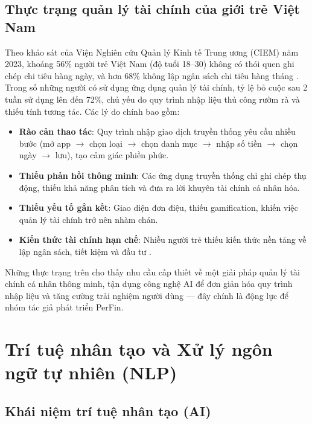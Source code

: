 \subsection{Thực trạng quản lý tài chính của giới trẻ Việt Nam}
\label{subsec:vietnam_youth_finance}

Theo khảo sát của Viện Nghiên cứu Quản lý Kinh tế Trung ương (CIEM) năm 2023, khoảng 56\% người trẻ Việt Nam (độ tuổi 18--30) không có thói quen ghi chép chi tiêu hàng ngày, và hơn 68\% không lập ngân sách chi tiêu hàng tháng \cite{ref5}. Trong số những người có sử dụng ứng dụng quản lý tài chính, tỷ lệ bỏ cuộc sau 2 tuần sử dụng lên đến 72\%, chủ yếu do quy trình nhập liệu thủ công rườm rà và thiếu tính tương tác. Các lý do chính bao gồm:

\begin{itemize}
    \item \textbf{Rào cản thao tác}: Quy trình nhập giao dịch truyền thống yêu cầu nhiều bước (mở app $\rightarrow$ chọn loại $\rightarrow$ chọn danh mục $\rightarrow$ nhập số tiền $\rightarrow$ chọn ngày $\rightarrow$ lưu), tạo cảm giác phiền phức.
    \item \textbf{Thiếu phản hồi thông minh}: Các ứng dụng truyền thống chỉ ghi chép thụ động, thiếu khả năng phân tích và đưa ra lời khuyên tài chính cá nhân hóa.
    \item \textbf{Thiếu yếu tố gắn kết}: Giao diện đơn điệu, thiếu gamification, khiến việc quản lý tài chính trở nên nhàm chán.
    \item \textbf{Kiến thức tài chính hạn chế}: Nhiều người trẻ thiếu kiến thức nền tảng về lập ngân sách, tiết kiệm và đầu tư \cite{ref6}.
\end{itemize}

Những thực trạng trên cho thấy nhu cầu cấp thiết về một giải pháp quản lý tài chính cá nhân thông minh, tận dụng công nghệ AI để đơn giản hóa quy trình nhập liệu và tăng cường trải nghiệm người dùng --- đây chính là động lực để nhóm tác giả phát triển PerFin.

\section{Trí tuệ nhân tạo và Xử lý ngôn ngữ tự nhiên (NLP)}
\label{sec:ai_and_nlp}

\subsection{Khái niệm trí tuệ nhân tạo (AI)}
\label{subsec:ai_concept}

